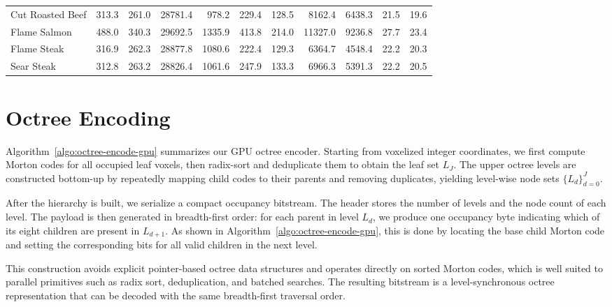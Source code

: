 \begin{table}[t]
\begin{tabular}{lrrrrrrrrrr}
  Cut Roasted Beef & 313.3 & 261.0 & 28781.4 & 978.2  & 229.4  & 128.5 & 8162.4  & 6438.3  & 21.5 & 19.6 \\
  Flame Salmon     & 488.0 & 340.3 & 29692.5 & 1335.9 & 413.8  & 214.0 & 11327.0 & 9236.8  & 27.7 & 23.4 \\
  Flame Steak      & 316.9 & 262.3 & 28877.8 & 1080.6 & 222.4  & 129.3 & 6364.7  & 4548.4  & 22.2 & 20.3 \\
  Sear Steak       & 312.8 & 263.2 & 28826.4 & 1061.6 & 247.9  & 133.3 & 6966.3  & 5391.3  & 22.2 & 20.5 \\
  \bottomrule
  \end{tabular}
\end{table}



\section{\gsnfs{} Octree Encoding}\label{app:sysn-octr-encod}

Algorithm~\ref{algo:octree-encode-gpu} summarizes our GPU octree encoder. Starting from voxelized integer coordinates, we first compute Morton codes for all occupied leaf voxels, then radix-sort and deduplicate them to obtain the leaf set $L_J$. The upper octree levels are constructed bottom-up by repeatedly mapping child codes to their parents and removing duplicates, yielding level-wise node sets $\{L_d\}_{d=0}^J$.

After the hierarchy is built, we serialize a compact occupancy bitstream. The header stores the number of levels and the node count of each level. The payload is then generated in breadth-first order: for each parent in level $L_d$, we produce one occupancy byte indicating which of its eight children are present in $L_{d+1}$. As shown in Algorithm~\ref{algo:octree-encode-gpu}, this is done by locating the base child Morton code and setting the corresponding bits for all valid children in the next level.

This construction avoids explicit pointer-based octree data structures and operates directly on sorted Morton codes, which is well suited to parallel primitives such as radix sort, deduplication, and batched searches. The resulting bitstream is a level-synchronous octree representation that can be decoded with the same breadth-first traversal order.

